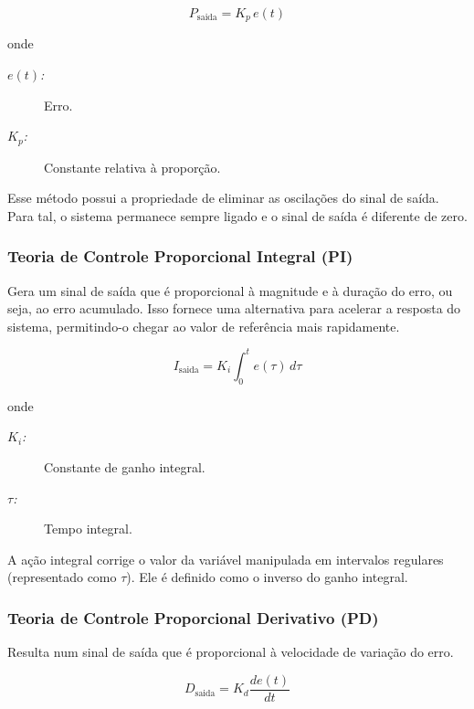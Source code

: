 \documentclass[portugues, brazil, a4paper,12pt]{article}
\begin{document}
	\begin{equation}
	P_{\mathrm {saida} }=K_{p}\,{e(t)}
	\end{equation}
	
	onde
	
	\begin{description}
		\item[$ e(t) $\textit{:}] Erro.
		
		\item[$ K_p $\textit{:}] Constante relativa à proporção.
	\end{description}
	
	Esse método possui a propriedade de eliminar as oscilações do sinal de saída. Para tal, o sistema permanece sempre ligado e o sinal de saída é diferente de zero.
	
	\subsubsection{Teoria de Controle Proporcional Integral (PI)} \label{sec:PI}
	Gera um sinal de saída que é proporcional à magnitude e à duração do erro, ou seja, ao erro acumulado. Isso fornece uma alternativa para acelerar a resposta do sistema, permitindo-o chegar ao valor de referência mais rapidamente.
	
	\begin{equation}
	I_{\mathrm {saida} }=K_{i}\int _{0}^{t}{e(\tau )}\,{d\tau }
	\end{equation}
	
	onde 
	
	\begin{description}
		\item[$ K_i $\textit{:}] Constante de ganho integral.
		
		\item[$ \tau $\textit{:}] Tempo integral.
	\end{description}
	
	A ação integral corrige o valor da variável manipulada em intervalos regulares (representado como $ \tau $). Ele é definido como o inverso do ganho integral. 
	
	\subsubsection{Teoria de Controle Proporcional Derivativo (PD)} \label{sec:PD}
	Resulta num sinal de saída que é proporcional à velocidade de variação do erro.
	
	\begin{equation}
	D_{\mathrm {saida} }=K_{d}{\frac {de(t)}{dt}}
	\end{equation}
	
\end{document}

